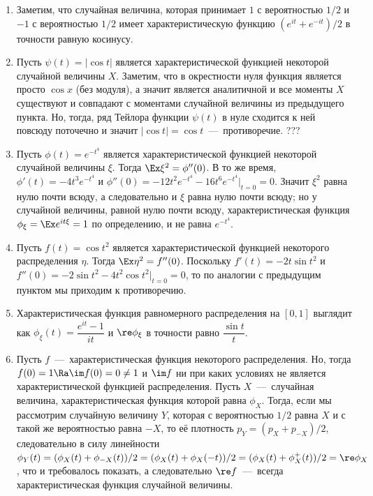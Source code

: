 \begin{solution} \leavevmode
    \begin{enumerate}
        \item Заметим, что случайная величина, которая принимает $1$ с вероятностью $1/2$ и $-1$ с вероятностью $1/2$ имеет характеристическую функцию $(e^{it} + e^{-it})/2$ в точности равную косинусу.
        \item Пусть $\psi(t) = |\cos t|$ является характеристической функцией некоторой случайной величины $X$.
        Заметим, что в окрестности нуля функция является просто $\cos x$ (без модуля), а значит является аналитичной и все моменты $X$ существуют и совпадают с моментами случайной величины из предыдущего пункта.
        Но, тогда, ряд Тейлора функции $\psi(t)$ в нуле сходится к ней повсюду поточечно и значит $|\cos t| = \cos t$~---~противоречие. ???
        \item Пусть $\phi(t) = e^{-t^4}$ является характеристической функцией некоторой случайной величины $\xi$.
        Тогда $\Ex \xi^2 = \phi''(0)$. В то же время, $\phi'(t) = -4t^{3}e^{-t^4}$ и $\phi''(0) = -12t^2 e^{-t^4} - 16t^6 e^{-t^4}|_{t = 0} = 0$.
        Значит $\xi^2$ равна нулю почти всюду, а следовательно и $\xi$ равна нулю почти всюду; но у случайной величины, равной нулю почти всюду, характеристическая функция $\phi_\xi = \Ex e^{it\xi} = 1$ по определению, и не равна $e^{-t^4}$.
        \item Пусть $f(t) = \cos t^2$ является характеристической функцией некоторого распределения $\eta$.
        Тогда $\Ex \eta^2 = f''(0)$. Поскольку $f'(t) = -2t \sin t^2$ и $f''(0) = -2\sin t^2 - 4t^2\cos t^2|_{t = 0} = 0$, то по аналогии с предыдущим пунктом мы приходим к противоречию.
        \item Характеристическая функция равномерного распределения на $[0, 1]$ выглядит как $\phi_\xi(t) = \dfrac{e^{it} - 1}{it}$ и $\re \phi_\xi$ в точности равно $\dfrac{\sin t}{t}$.
        \item Пусть $f$~---~характеристическая функция некоторого распределения. Но, тогда $f(0) = 1 \Ra \im f(0) = 0 \neq 1$ и $\im f$ ни при каких условиях не является характеристической функцией распределения.
        Пусть $X$~---~случайная величина, характеристическая функция которой равна $\phi_X$. Тогда, если мы рассмотрим случайную величину $Y$, которая с вероятностью $1/2$ равна $X$ и с такой же вероятностью равна $-X$, то её плотность $p_Y = (p_X + p_{-X})/2$, следовательно в силу линейности $\phi_Y(t) = (\phi_X(t) + \phi_{-X}(t))/2 = (\phi_X(t) + \phi_X(-t))/2 = (\phi_X(t) + \phi_X^+(t))/2 = \re \phi_X$, что и требовалось показать, а следовательно $\re f$~---~всегда характеристическая функция случайной величины.
    \end{enumerate}
\end{solution}
